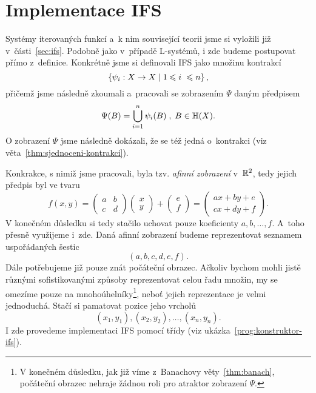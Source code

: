 \section{Implementace IFS}\label{sec:implementace-ifs}

Systémy iterovaných funkcí a~k nim související teorii jsme si vyložili již v~části~\ref{sec:ifs}. Podobně jako v~případě L-systémů, i zde budeme postupovat přímo z~definice. Konkrétně jsme si definovali IFS jako množinu kontrakcí
\[\left\{\psi_i:X \rightarrow X\mid 1\leqslant i~\leqslant n\right\},\]
přičemž jsme následně zkoumali a~pracovali se zobrazením $\Psi$ daným předpisem
\[\Psi(B)=\bigcup_{i=1}^n\psi_i(B)\;,\;B\in\mathbb{H}(X).\]
O zobrazení $\Psi$ jsme následně dokázali, že se též jedná o~kontrakci (viz věta~\ref{thm:sjednoceni-kontrakci}).

Konkrakce, s nimiž jsme pracovali, byla tzv. \emph{afinní zobrazení} v~$\mathbb{R}^2$, tedy jejich předpis byl ve tvaru
\begin{equation}\label{eq:afinni-zobrazeni}
    f(x,y)=\left(\begin{matrix}
        a & b\\
        c & d
    \end{matrix}\right)\left(\begin{matrix}
        x\\
        y
    \end{matrix}\right)+\left(\begin{matrix}
        e\\
        f
    \end{matrix}\right)=\left(\begin{matrix}
        ax+by+e\\
        cx+dy+f
    \end{matrix}\right).
\end{equation}
V konečném důsledku si tedy stačilo uchovat pouze koeficienty $a,b,\ldots,f$. A~toho přesně využijeme i~zde. Daná afinní zobrazení budeme reprezentovat seznamem uspořádaných šestic
\[(a,b,c,d,e,f).\]
Dále potřebujeme již pouze znát počáteční obrazec. Ačkoliv bychom mohli jistě různými sofistikovanými způsoby reprezentovat celou řadu množin, my se omezíme pouze na mnohoúhelníky\footnote{V konečném důsledku, jak již víme z~Banachovy věty~\ref{thm:banach}, počáteční obrazec nehraje žádnou roli pro atraktor zobrazení $\Psi$.}, neboť jejich reprezentace je velmi jednoduchá. Stačí si pamatovat pozice jeho vrcholů
\[(x_1,y_1),(x_2,y_2),\ldots,(x_n,y_n).\]
I zde provedeme implementaci IFS pomocí třídy (viz ukázka~\ref{prog:konstruktor-ifs}).
